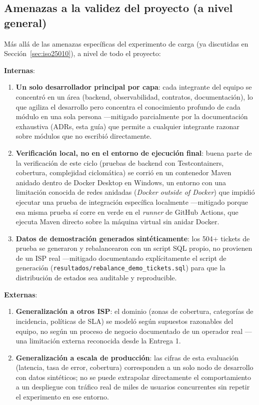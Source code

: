 \subsection{Amenazas a la validez del proyecto (a nivel general)}

Más allá de las amenazas específicas del experimento de carga (ya discutidas en
Sección~\ref{sec:iso25010}), a nivel de todo el proyecto:

\textbf{Internas}:
\begin{enumerate}[nosep]
  \item \textbf{Un solo desarrollador principal por capa}: cada integrante del equipo se
        concentró en un área (backend, observabilidad, contratos, documentación), lo que agiliza
        el desarrollo pero concentra el conocimiento profundo de cada módulo en una sola persona
        —mitigado parcialmente por la documentación exhaustiva (ADRs, esta guía) que permite a
        cualquier integrante razonar sobre módulos que no escribió directamente.
  \item \textbf{Verificación local, no en el entorno de ejecución final}: buena parte de la
        verificación de este ciclo (pruebas de backend con Testcontainers, cobertura, complejidad
        ciclomática) se corrió en un contenedor Maven anidado dentro de Docker Desktop en
        Windows, un entorno con una limitación conocida de redes anidadas (\emph{Docker outside
        of Docker}) que impidió ejecutar una prueba de integración específica localmente —mitigado
        porque esa misma prueba sí corre en verde en el \emph{runner} de GitHub Actions, que
        ejecuta Maven directo sobre la máquina virtual sin anidar Docker.
  \item \textbf{Datos de demostración generados sintéticamente}: los 504+ tickets de prueba se
        generaron y rebalancearon con un script SQL propio, no provienen de un ISP real —mitigado
        documentando explícitamente el script de generación (\texttt{resultados/rebalance\_demo\_tickets.sql})
        para que la distribución de estados sea auditable y reproducible.
\end{enumerate}

\textbf{Externas}:
\begin{enumerate}[nosep]
  \item \textbf{Generalización a otros ISP}: el dominio (zonas de cobertura, categorías de
        incidencia, políticas de SLA) se modeló según supuestos razonables del equipo, no según
        un proceso de negocio documentado de un operador real —una limitación externa reconocida
        desde la Entrega 1.
  \item \textbf{Generalización a escala de producción}: las cifras de esta evaluación (latencia,
        tasa de error, cobertura) corresponden a un solo nodo de desarrollo con datos sintéticos;
        no se puede extrapolar directamente el comportamiento a un despliegue con tráfico real de
        miles de usuarios concurrentes sin repetir el experimento en ese entorno.
\end{enumerate}

